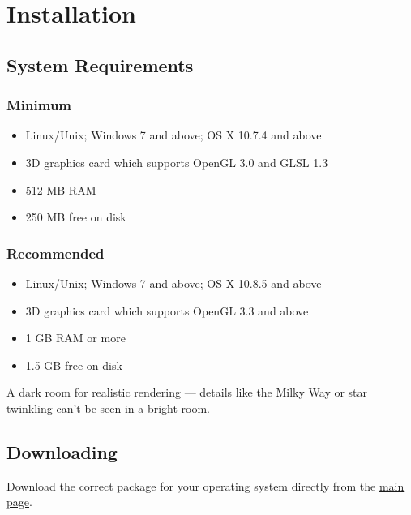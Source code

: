 

\chapter{Installation}\label{installation}

\section{System Requirements}

\subsection{Minimum}
\begin{itemize}
\item Linux/Unix; Windows 7 and above; OS X 10.7.4 and above
\item 3D graphics card which supports OpenGL 3.0 and GLSL 1.3
\item 512 MB RAM
\item 250 MB free on disk
\end{itemize}

\subsection{Recommended}
\begin{itemize}
\item Linux/Unix; Windows 7 and above; OS X 10.8.5 and above
\item 3D graphics card which supports OpenGL 3.3 and above
\item 1 GB RAM or more
\item 1.5 GB free on disk
\end{itemize}
 A dark room for realistic rendering --- details like the Milky Way or
star twinkling can't be seen in a bright room.

\section{Downloading}

Download the correct package for your operating system directly from the
\href{http://stellarium.org}{main page}.

